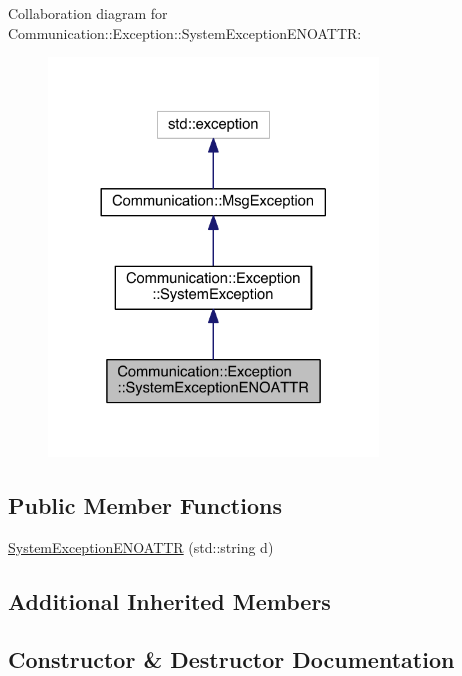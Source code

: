 Collaboration diagram for Communication\+:\+:Exception\+:\+:System\+Exception\+E\+N\+O\+A\+T\+T\+R\+:\nopagebreak
\begin{figure}[H]
\begin{center}
\leavevmode
\includegraphics[width=248pt]{class_communication_1_1_exception_1_1_system_exception_e_n_o_a_t_t_r__coll__graph}
\end{center}
\end{figure}
\subsection*{Public Member Functions}
\begin{DoxyCompactItemize}
\item 
\hyperlink{class_communication_1_1_exception_1_1_system_exception_e_n_o_a_t_t_r_a14115006b712f142d8653e2b7a08188d}{System\+Exception\+E\+N\+O\+A\+T\+T\+R} (std\+::string d)
\end{DoxyCompactItemize}
\subsection*{Additional Inherited Members}


\subsection{Constructor \& Destructor Documentation}
\hypertarget{class_communication_1_1_exception_1_1_system_exception_e_n_o_a_t_t_r_a14115006b712f142d8653e2b7a08188d}{}
